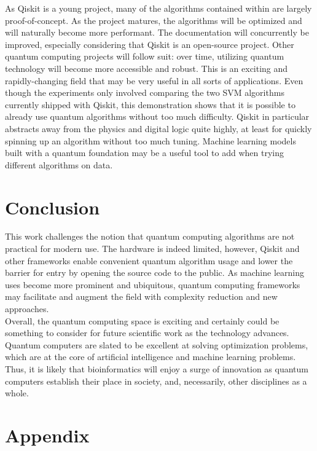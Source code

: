 \documentclass{article}
\begin{document}
  As Qiskit is a young project, many of the algorithms contained within are largely proof-of-concept. As the project matures, the algorithms will be optimized and will naturally become more performant. The documentation will concurrently be improved, especially considering that Qiskit is an open-source project. Other quantum computing projects will follow suit: over time, utilizing quantum technology will become more accessible and robust. This is an exciting and rapidly-changing field that may be very useful in all sorts of applications. Even though the experiments only involved comparing the two SVM algorithms currently shipped with Qiskit, this demonstration shows that it is possible to already use quantum algorithms without too much difficulty. Qiskit in particular abstracts away from the physics and digital logic quite highly, at least for quickly spinning up an algorithm without too much tuning. Machine learning models built with a quantum foundation may be a useful tool to add when trying different algorithms on data.

\section*{Conclusion}
  This work challenges the notion that quantum computing algorithms are not practical for modern use. The hardware is indeed limited, however, Qiskit and other frameworks enable convenient quantum algorithm usage and lower the barrier for entry by opening the source code to the public. As machine learning uses become more prominent and ubiquitous, quantum computing frameworks may facilitate and augment the field with complexity reduction and new approaches. \\

  Overall, the quantum computing space is exciting and certainly could be something to consider for future scientific work as the technology advances. Quantum computers are slated to be excellent at solving optimization problems, which are at the core of artificial intelligence and machine learning problems. Thus, it is likely that bioinformatics will enjoy a surge of innovation as quantum computers establish their place in society, and, necessarily, other disciplines as a whole.

\newpage

\raggedright


\section*{Appendix}
\end{document}
